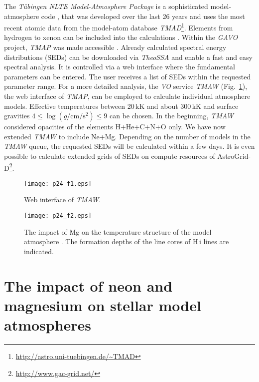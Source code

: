 \documentclass[11pt,twoside]{article}
\begin{document}
The \emph{T\"ubingen NLTE Model-Atmosphere Package} 
\citep[\emph{TMAP},][]{werneretal2003, rauchdeetjen2003} is a 
sophisticated model-atmosphere code 
\citep[e.g\@.][]{rauchetal2007},
that was developed over the last 26 years 
and uses the most recent atomic data from the model-atom database
\emph{TMAD}\footnote[1]{\url{http://astro.uni-tuebingen.de/~TMAD}}.
Elements from hydrogen to xenon can be included into the calculations 
\citep{rauch2003,werneretal2012,rauchetal2012}. 
Within the \emph{GAVO} project, \emph{TMAP} was made accessible \citep{rauchringat2011}.
Already calculated spectral energy distributions
(SEDs) can be downloaded via \emph{TheoSSA} and enable a fast and 
easy spectral analysis. It is controlled via a web interface where the fundamental 
parameters can be entered. The user receives a list of SEDs within the requested 
parameter range. For a more detailed analysis, the \emph{VO} service \emph{TMAW} (Fig.~\ref{fig:tmaw}), the 
web interface of \emph{TMAP}, can be employed to calculate individual atmosphere models. 
Effective temperatures between 20\,kK and about 300\,kK and surface gravities
$4 \leq \log (g / \mathrm{cm/s^2}) \leq 9$ can be chosen.
In the beginning,  \emph{TMAW} considered opacities of the elements H+He+C+N+O only.
We have now extended \emph{TMAW} to include Ne+Mg.
Depending on the number of models in the \emph{TMAW} queue, the requested SEDs 
will be calculated within a few days. It is even possible to calculate
extended grids of SEDs on compute resources of AstroGrid-D\footnote[2]{\url{http://www.gac-grid.net/}}.


\begin{landscape}
\begin{figure}[ht!]\centering
\texttt{[image: p24\_f1.eps]}
\caption{Web interface of \emph{TMAW}.}
\label{fig:tmaw}
\end{figure}
\end{landscape}


\begin{figure}[ht!]\centering
\texttt{[image: p24\_f2.eps]}
\caption{The impact of Mg on the temperature structure of the model atmosphere
         \citep[$T_\mathrm{eff}=60\,\mathrm{kK}$, $\log g = 7$, solar abundances,][]{asplundetal2009}.
         The formation depths of the line cores of H\,{\sc i} lines are indicated.}
\label{fig:Tstruc}
\end{figure}


\section{The impact of neon and magnesium on stellar model atmospheres}
\label{sect:nemg}
\end{document}

